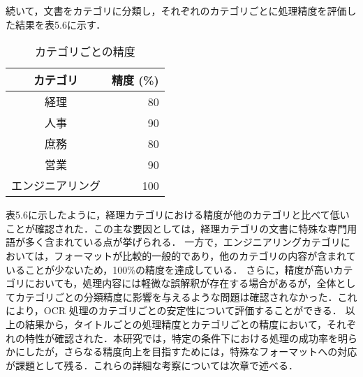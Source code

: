 続いて，文書をカテゴリに分類し，それぞれのカテゴリごとに処理精度を評価した結果を表5.6に示す．

\begin{table}[h]
  \begin{center}
  \begin{tabular}{|c|r|}
    \hline
    \textbf{カテゴリ} & \textbf{精度 (\%)} \\ \hline
    経理 & 80 \\ \hline
    人事 & 90 \\ \hline
    庶務 & 80 \\ \hline
    営業 & 90 \\ \hline
    エンジニアリング & 100 \\ \hline
  \end{tabular}
  \end{center}
  \caption{カテゴリごとの精度}
  \label{tab:category_accuracy}
\end{table}

表5.6に示したように，経理カテゴリにおける精度が他のカテゴリと比べて低いことが確認された．この主な要因としては，経理カテゴリの文書に特殊な専門用語が多く含まれている点が挙げられる．
一方で，エンジニアリングカテゴリにおいては，フォーマットが比較的一般的であり，他のカテゴリの内容が含まれていることが少ないため，100\%の精度を達成している．
さらに，精度が高いカテゴリにおいても，処理内容には軽微な誤解釈が存在する場合があるが，全体としてカテゴリごとの分類精度に影響を与えるような問題は確認されなかった．これにより，OCR 処理のカテゴリごとの安定性について評価することができる．
以上の結果から，タイトルごとの処理精度とカテゴリごとの精度において，それぞれの特性が確認された．本研究では，特定の条件下における処理の成功率を明らかにしたが，さらなる精度向上を目指すためには，特殊なフォーマットへの対応が課題として残る．これらの詳細な考察については次章で述べる．
